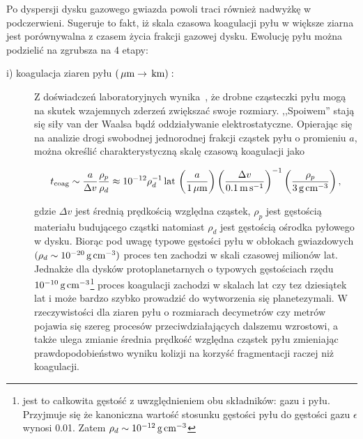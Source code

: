 \par Po dyspersji dysku gazowego gwiazda powoli traci również nadwyżkę w
podczerwieni. Sugeruje to fakt, iż skala czasowa koagulacji pyłu w większe
ziarna jest porównywalna z czasem życia frakcji gazowej dysku. Ewolucję pyłu
można podzielić na zgrubsza na 4 etapy:
\begin{description}
   \item[i) koagulacja ziaren pyłu $\left(\hbox{$\thinspace\mu\textrm{m}$} \rightarrow \hbox{$\thinspace\textrm{km}$}\right):$] 
      Z doświadczeń laboratoryjnych wynika~\cite{BW08}, że drob\-ne cząsteczki pyłu
      mogą na skutek wzajemnych zderzeń zwiększać swoje rozmiary. ,,Spoiwem'' stają
      się siły van der Waalsa bądź oddziaływanie elektrostatyczne. Opierając się
      na analizie drogi swobodnej jednorodnej frakcji cząstek pyłu o promieniu
      $a$, można określić charakterystyczną skalę czasową koagulacji jako 

   \begin{equation}\label{coag} 
      t_{\textrm{coag}} %
      \sim \frac{a}{\Delta v}\frac{\rho_p}{\rho_d} \approx 
      10^{-12} \rho_d^{-1}\yr\thinspace
      \left(\frac{a}{1\mum}\right)
      \left(\frac{\Delta v}{0.1\m\s^{-1}}\right)^{-1}
      \left(\frac{\rho_p}{3\g\cm^{-3}}\right),
   \end{equation}

   gdzie $\Delta v$ jest średnią prędkością względna cząstek, $\rho_p$ jest
   gęstością materiału budującego cząstki natomiast $\rho_d$ jest gęstością
   ośrodka pyłowego w dysku.  Biorąc pod uwagę typowe gęstości pyłu w obłokach
   gwiazdowych $(\rho_d \sim 10^{-20}\hbox{$\thinspace\textrm{g}$}\hbox{$\thinspace\textrm{cm}$}^{-3})$ proces ten
   zachodzi w skali czasowej milionów lat. Jednakże dla dysków protoplanetarnych
   o typowych gęstościach rzędu $10^{-10}\hbox{$\thinspace\textrm{g}$}\hbox{$\thinspace\textrm{cm}$}^{-3}$\footnote{jest to całkowita
   gęstość z uwzględnieniem obu składników: gazu i pyłu. Przyjmuje się że
kanoniczna wartość stosunku gęstości pyłu do gęstości gazu $\epsilon$ wynosi
0.01. Zatem $\rho_d \sim 10^{-12}\hbox{$\thinspace\textrm{g}$}\hbox{$\thinspace\textrm{cm}$}^{-3}$} proces
koagulacji zachodzi w skalach lat czy tez dziesiątek lat i może bardzo szybko
prowadzić do wytworzenia się planetezymali. W rzeczywistości dla ziaren pyłu o
rozmiarach decymetrów czy metrów pojawia się szereg procesów przeciwdziałających
dalszemu wzrostowi, a także ulega zmianie średnia prędkość względna cząstek pyłu
zmieniając prawdopodobieństwo wyniku kolizji na korzyść fragmentacji raczej niż
koagulacji.  


\end{description}
